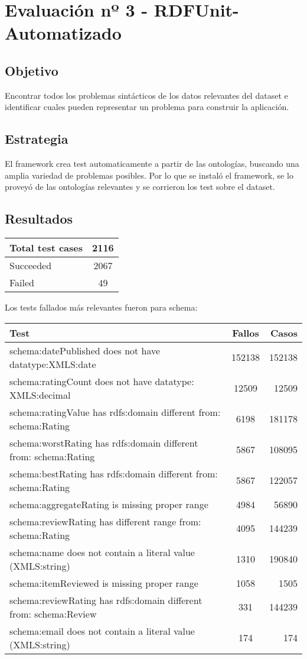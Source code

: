\section{Evaluación nº 3 - RDFUnit-Automatizado}
\label{section:evaluacion-automatizado}

\subsection*{Objetivo}
Encontrar todos los problemas sintácticos de los datos relevantes del dataset e identificar cuales pueden representar un problema 
para construir la aplicación.

\subsection*{Estrategia}
El framework crea test automaticamente a partir de las ontologías, buscando una amplia variedad de problemas posibles. Por lo que se 
instaló el framework, se lo proveyó de las ontologías relevantes y se corrieron los test sobre el dataset.

\subsection*{Resultados}

\begin{tabular}{| l | c | }\hline
Total test cases & 2116\\\hline
Succeeded & 2067\\
Failed & 49\\\hline
\end{tabular}

Los tests fallados más relevantes fueron para schema:

\begin{tabular}{| l | c | r | }\hline
Test & Fallos & Casos \\\hline
 schema:datePublished does not have datatype:XMLS:date & 152138 & 152138\\
 schema:ratingCount does not have datatype: XMLS:decimal & 12509 & 12509\\
 schema:ratingValue has rdfs:domain different from: schema:Rating & 6198 & 181178\\
 schema:worstRating has rdfs:domain different from: schema:Rating & 5867 & 108095\\
 schema:bestRating has rdfs:domain different from: schema:Rating & 5867 & 122057\\
 schema:aggregateRating is missing proper range & 4984 & 56890\\
 schema:reviewRating has different range from: schema:Rating & 4095 & 144239\\
 schema:name does not contain a literal value (XMLS:string) & 1310 & 190840\\
 schema:itemReviewed is missing proper range & 1058 & 1505\\
 schema:reviewRating has rdfs:domain different from: schema:Review & 331 & 144239\\
 schema:email does not contain a literal value (XMLS:string) & 174  & 174 \\ \hline
\end{tabular}

